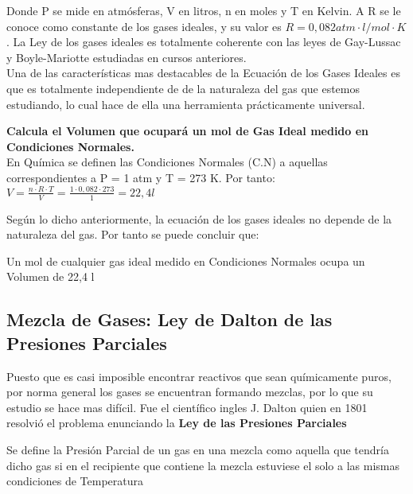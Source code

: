 Donde P se mide en atmósferas, V en litros, n en moles y T en Kelvin. A R se le conoce como constante de los gases ideales, y su valor es $R = 0,082 atm \cdot l/ mol\cdot K$. La Ley de los gases ideales es totalmente coherente con las leyes de Gay-Lussac y Boyle-Mariotte estudiadas en cursos anteriores.\\

Una de las características mas destacables de la Ecuación de los Gases Ideales es que es totalmente independiente de de la naturaleza del gas que estemos estudiando, lo cual hace de ella una herramienta prácticamente universal.\\

\begin{exercise}
	\textbf{Calcula el Volumen que ocupará un mol de Gas Ideal medido en Condiciones Normales.}\\
	
	En Química se definen las Condiciones Normales (C.N) a aquellas correspondientes a P = 1 atm y T = 273 K. Por tanto:\\
	
	$V = \frac{n \cdot R \cdot T}{V} = \frac{1 \cdot 0,082 \cdot 273}{1} = 22,4 l$
		
\end{exercise}

Según lo dicho anteriormente, la ecuación de los gases ideales no depende de la naturaleza del gas. Por tanto se puede concluir que:\\

\begin{definition}
	Un mol de cualquier gas ideal medido en Condiciones Normales ocupa un Volumen de 22,4 l
\end{definition}

\subsection{Mezcla de Gases: Ley de Dalton de las Presiones Parciales}

Puesto que es casi imposible encontrar reactivos que sean químicamente puros, por norma general los gases se encuentran formando mezclas, por lo que su estudio se hace mas difícil. Fue el científico ingles J. Dalton quien en 1801 resolvió el problema enunciando la \textbf{Ley de las Presiones Parciales}\\

\begin{definition}
	Se define la Presión Parcial de un gas en una mezcla como aquella que tendría dicho gas si en el recipiente que contiene la mezcla estuviese el solo a las mismas condiciones de Temperatura 
\end{definition}

